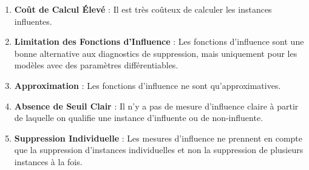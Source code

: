 \begin{enumerate}
    \item \textbf{Coût de Calcul Élevé} : Il est très coûteux de calculer les instances influentes.
    \item \textbf{Limitation des Fonctions d'Influence} : Les fonctions d'influence sont une bonne alternative aux diagnostics de suppression, mais uniquement pour les modèles avec des paramètres différentiables.
    \item \textbf{Approximation} : Les fonctions d'influence ne sont qu'approximatives.
    \item \textbf{Absence de Seuil Clair} : Il n'y a pas de mesure d'influence claire à partir de laquelle on qualifie une instance d'influente ou de non-influente.
    \item \textbf{Suppression Individuelle} : Les mesures d'influence ne prennent en compte que la suppression d'instances individuelles et non la suppression de plusieurs instances à la fois.
\end{enumerate}
